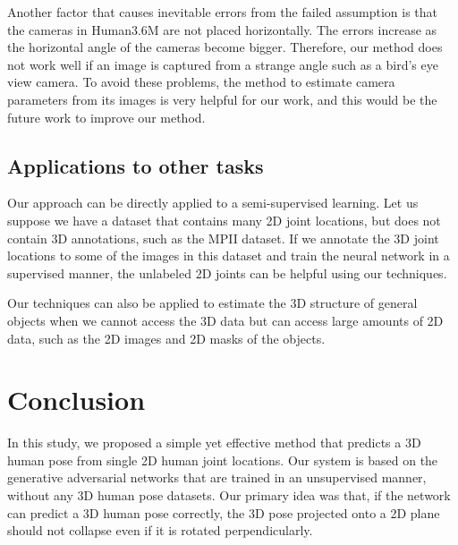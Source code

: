 \documentclass[runningheads]{llncs}
\newcommand{\matsui}[1]{\textbf{\textcolor{cyan}{[\textsc{MATSUI:} #1]}}}
\begin{document}
Another factor that causes inevitable errors from the failed assumption is that the cameras in Human3.6M are not placed horizontally.
The errors increase as the horizontal angle of the cameras become bigger.
Therefore, our method does not work well if an image is captured from a strange angle such as a bird's eye view camera.
To avoid these problems, the method to estimate camera parameters from its images is very helpful for our work, and this would be the future work to improve our method.

\subsection{Applications to other tasks}
Our approach can be directly applied to a semi-supervised learning.
Let us suppose we have a dataset that contains many 2D joint locations, but does not contain 3D annotations, such as the MPII dataset.
If we annotate the 3D joint locations to some of the images in this dataset and train the neural network in a supervised manner, the unlabeled 2D joints can be helpful using our techniques.

Our techniques can also be applied to estimate the 3D structure of general objects when we cannot access the 3D data but can access large amounts of 2D data, such as the 2D images and 2D masks of the objects.

\section{Conclusion}
In this study, we proposed a simple yet effective method that predicts a 3D human pose from single 2D human joint locations.
Our system is based on the generative adversarial networks that are trained in an unsupervised manner, without any 3D human pose datasets.
Our primary idea was that, if the network can predict a 3D human pose correctly, the 3D pose projected onto a 2D plane should not collapse even if it is rotated perpendicularly.
\end{document}
